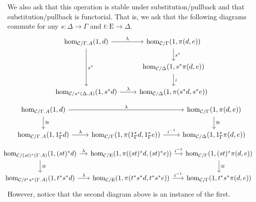 \documentclass{article}
\theoremstyle{definition}
\newcommand{\C}{\mathcal C}
\newcommand{\Epsilon}{\mathrm E}
\begin{document}
We also ask that this operation is stable under substitution/pullback and that substitution/pullback is functorial. That is, we ask that the following diagrams commute for any $s : \Delta \to \Gamma$ and $t: \Epsilon \to \Delta$.
\[
     \begin{tikzcd}
        \hom_{\C / \Gamma . A} (1, d)  \ar[dd,"s^*"] \ar[r, "\lambda"] & \hom_{\C / \Gamma} (1 , {\pi(d,e)}) \ar[d,"s^*"]
         \\
         & \hom_{\C / \Delta} (1 , s^* {\pi(d,e)})
         \ar[d,"i"]
         \\
         \hom_{\C / s^*(\Delta . A)} (1, s^* d) \ar[r,"\lambda"] & \hom_{\C / \Delta} (1 ,  {\pi(s^*d,s^*e)})
     \end{tikzcd}
\]
\[
     \begin{tikzcd}
        \hom_{\C / \Gamma . A} (1, d) \ar[d,"\cong"] \ar[rr, "\lambda"] &&  \hom_{\C / \Gamma} (1 , {\pi(d,e)}) \ar[d,"\cong"]
        \\
        \hom_{\C / \Gamma.A} (1, 1_{\Gamma}^* d) \ar[r,"\lambda"] & \hom_{\C / \Gamma} (1 , {\pi(1_\Gamma^* d,1_\Gamma^* e)}) \ar[r,"i^{-1}"] & \hom_{\C / \Delta} (1 ,  1_\Gamma^* {\pi(d,e)})
     \end{tikzcd}
\]
\[\hspace{-1em}
     \begin{tikzcd}[column sep=small]
        \hom_{\C / (st)^*(\Gamma . A)} (1, (st)^*d) \ar[d,"\cong"] \ar[r, "\lambda"] &
        \hom_{\C / \Epsilon} (1 , {\pi((st)^*d,(st)^*e)})  \ar[r,"i^{-1}"]
        &  \hom_{\C / \Gamma} (1 , (st)^* \pi(d,e)) \ar[d,"\cong"]
        \\
        \hom_{\C / t^* s^* (\Gamma . A)} (1, t^* s^*d)  \ar[r, "\lambda"] &
        \hom_{\C / \Epsilon} (1 , {\pi(t^* s^*d,t^* s^*e)})  \ar[r,"i^{-1}"]
        &  \hom_{\C / \Gamma} (1 , t^* s^* \pi(d,e)) 
     \end{tikzcd}
\]
However, notice that the second diagram above is an instance of the first.
\end{document}
